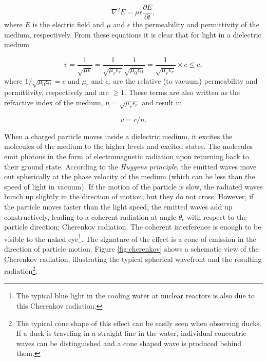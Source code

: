 \begin{equation}
\nabla^2E = \mu \epsilon \frac{\partial E}{\partial t},
\end{equation}
where $E$ is the electric field and $\mu$ and $\epsilon$ the permeability and permittivity of the medium, respectively. From these equations it is clear that for light in a dielectric medium

\begin{equation}
v = \frac{1}{\sqrt{\mu \epsilon}} = \frac{1}{\sqrt{\mu_r \epsilon_r}}\frac{1}{\sqrt{\mu_0 \epsilon_0}} = \frac{1}{\sqrt{\mu_r \epsilon_r}} \times c \leq c,
\end{equation}
where $1/\sqrt{\mu_0 \epsilon_0} = c$ and $\mu_r$ and $\epsilon_r$ are the relative (to vacuum) permeability and permittivity, respectively and are $\geq 1$. These terms are also written as the refractive index of the medium, $n = \sqrt{\mu_r \epsilon_r}$ and result in

\begin{equation}
v = c/n.
\end{equation}

\noindent When a charged particle moves inside a dielectric medium, it excites the molecules of the medium to the higher levels and excited states. The molecules emit photons in the form of electromagnetic radiation upon returning back to their ground state. According to the \textit{Huygens principle}, the emitted waves move out spherically at the phase velocity of the medium (which can be less than the speed of light in vacuum). If the motion of the particle is slow, the radiated waves bunch up slightly in the direction of motion, but they do not cross. However, if the particle moves faster than the light speed, the emitted waves add up constructively, leading to a coherent radiation at angle $\theta_c$ with respect to the particle direction; Cherenkov radiation. The coherent interference is enough to be visible to the naked eye\footnote{The typical blue light in the cooling water at nuclear reactors is also due to this Cherenkov radiation.}. The signature of the effect is a cone of emission in the direction of particle motion. Figure \ref{fig:cherenkov} shows a schematic view of the Cherenkov radiation, illustrating the typical spherical wavefront and the resulting radiation\footnote{The typical cone shape of this effect can be easily seen when observing ducks. If a duck is traveling in a straight line in the water, individual concentric waves can be distinguished and a cone shaped wave is produced behind them.}.

